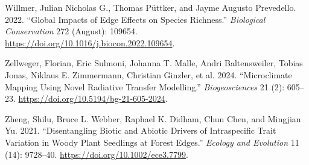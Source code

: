 \documentclass[
  12pt,
]{article}
\newlength{\cslhangindent}
\newenvironment{CSLReferences}[2] %
 {\begin{list}{}{%
  \setlength{\itemindent}{0pt}
  \setlength{\leftmargin}{0pt}
  \setlength{\parsep}{0pt}
  \ifodd #1
   \setlength{\leftmargin}{\cslhangindent}
   \setlength{\itemindent}{-1\cslhangindent}
  \fi
  \setlength{\itemsep}{#2\baselineskip}}}
 {\end{list}}
\begin{document}
\begin{CSLReferences}{1}{0}
Willmer, Julian Nicholas G., Thomas Püttker, and Jayme Augusto
Prevedello. 2022. {``Global Impacts of Edge Effects on Species
Richness.''} \emph{Biological Conservation} 272 (August): 109654.
\url{https://doi.org/10.1016/j.biocon.2022.109654}.

Zellweger, Florian, Eric Sulmoni, Johanna T. Malle, Andri Baltensweiler,
Tobias Jonas, Niklaus E. Zimmermann, Christian Ginzler, et al. 2024.
{``Microclimate Mapping Using Novel Radiative Transfer Modelling.''}
\emph{Biogeosciences} 21 (2): 605--23.
\url{https://doi.org/10.5194/bg-21-605-2024}.

Zheng, Shilu, Bruce L. Webber, Raphael K. Didham, Chun Chen, and
Mingjian Yu. 2021. {``Disentangling Biotic and Abiotic Drivers of
Intraspecific Trait Variation in Woody Plant Seedlings at Forest
Edges.''} \emph{Ecology and Evolution} 11 (14): 9728--40.
\url{https://doi.org/10.1002/ece3.7799}.

\end{CSLReferences}
\end{document}
